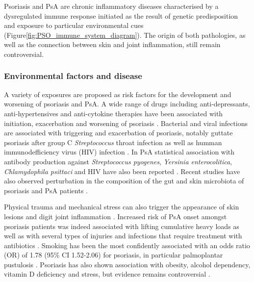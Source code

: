 Psoriasis and PsA are chronic inflammatory diseases characterised by a dysregulated immune response initiated as the result of genetic predisposition and exposure to particular environmental cues (Figure\ref{fig:PSO_immune_system_diagram}). The origin of both pathologies, as well as the connection between skin and joint inflammation, still remain controversial.


\subsubsection*{Environmental factors and disease}
A variety of exposures are proposed as risk factors for the development and worsening of psoriasis and PsA. A wide range of drugs including anti-depressants, anti-hypertensives and anti-cytokine therapies have been associated with initiation, exacerbation and worsening of psoriasis \parencite{Kim2010}. Bacterial and viral infections are associated with triggering and exacerbation of psoriasis, notably guttate psoriasis after group C \textit{Streptococcus} throat infection as well as humman immunodefficiency virus (HIV) infection \parencite{Gudjonsson2003,Valdimarsson2009, Diluvio2006}. \textcolor[rgb]{1,0,0}{In PsA statistical association with antibody production against \textit{Streptococcus pyogenes}, \textit{Yersinia enterocolitica}, \textit{ Chlamydophila psittaci} and HIV have also been reported \parencite{Thrastardottir2018}. Recent studies have also observed perturbation in the composition of the gut and skin microbiota of psoriasis and PsA patients \parencite{Eppinga2014, Yan2017}.}

Physical trauma and mechanical stress can also trigger the appearance of skin lesions and digit joint inflammation \parencite {Weiss2002,Nestle2009}. Increased risk of PsA onset amongst psoriasis patients was indeed associated with lifting cumulative heavy loads as well as with several types of injuries and infections that require treatment with antibiotics \parencite{Eder2011}. Smoking has been the most confidently associated with an odds ratio  (OR) of 1.78 (95\% CI 1.52-2.06) for psoriasis, in particular palmoplantar pustulosis \parencite{Armstrong2014}. Psoriasis has also shown association with obesity, alcohol dependency, vitamin D deficiency and stress, but evidence remains controversial \parencite{Meglio2014}. 

